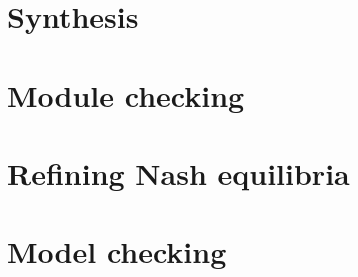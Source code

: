 \documentclass{article}
\theoremstyle{definition}
\theoremstyle{plain}
\begin{document}
\section{Synthesis}
\label{section:synthesis}


\section{Module checking}
\label{section:module}


\section{Refining Nash equilibria}
\label{section:nash}


\section{Model checking \SLref}
\label{section:mc}




\end{document}

